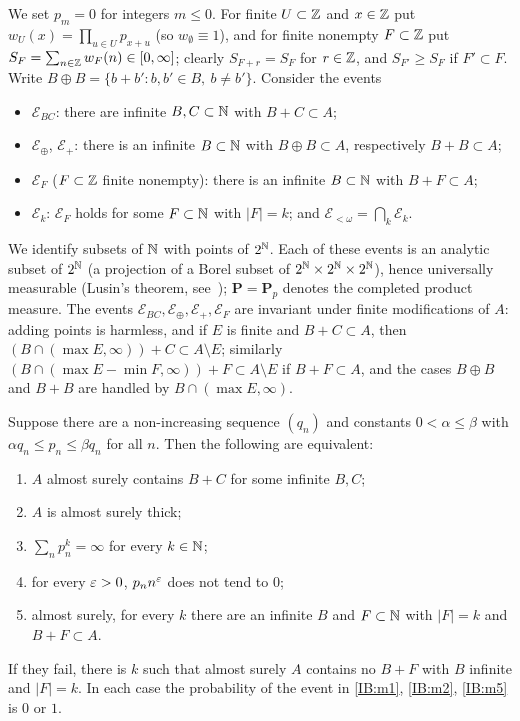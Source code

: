 We set $p_m=0$ for integers $m\le0$. For finite $U\subset\mathbb{Z}$ and $x\in\mathbb{Z}$ put
$w_U(x)=\prod_{u\in U}p_{x+u}$ (so $w_\emptyset\equiv1$), and for finite nonempty $F\subset\mathbb{Z}$
put $S_F=\sum_{n\in\mathbb{Z}}w_F(n)\in[0,\infty]$; clearly $S_{F+r}=S_F$ for $r\in\mathbb{Z}$, and
$S_{F'}\ge S_F$ if $F'\subset F$. Write $B\oplus B=\{b+b':b,b'\in B,\ b\ne b'\}$. Consider the
events
\begin{itemize}
\item $\mathcal E_{BC}$: there are infinite $B,C\subset\mathbb{N}$ with $B+C\subset A$;
\item $\mathcal E_\oplus$, $\mathcal E_+$: there is an infinite $B\subset\mathbb{N}$ with $B\oplus B\subset A$,
respectively $B+B\subset A$;
\item $\mathcal E_F$ ($F\subset\mathbb{Z}$ finite nonempty): there is an infinite $B\subset\mathbb{N}$ with $B+F\subset A$;
\item $\mathcal E_k$: $\mathcal E_F$ holds for some $F\subset\mathbb{N}$ with $|F|=k$; and
$\mathcal E_{<\omega}=\bigcap_k\mathcal E_k$.
\end{itemize}
We identify subsets of $\mathbb{N}$ with points of $2^{\mathbb{N}}$. Each of these events is an
analytic subset of $2^{\mathbb{N}}$ (a projection of a Borel subset of $2^{\mathbb{N}}\times2^{\mathbb{N}}\times2^{\mathbb{N}}$),
hence universally measurable (Lusin's theorem, see~\cite[Theorem~21.10]{kechris1995classical}); $\mathbf P=\mathbf P_p$
denotes the completed product measure.
The events $\mathcal E_{BC},\mathcal E_\oplus,\mathcal E_+,\mathcal E_F$ are invariant under
finite modifications of $A$: adding points is harmless, and if $E$ is finite and
$B+C\subset A$, then $(B\cap(\max E,\infty))+C\subset A\setminus E$; similarly
$(B\cap(\max E-\min F,\infty))+F\subset A\setminus E$ if $B+F\subset A$, and the cases $B\oplus B$ and
$B+B$ are handled by $B\cap(\max E,\infty)$.

\begin{theorem}
\label{IB:thm:monotone}
Suppose there are a non-increasing sequence $(q_n)$ and constants $0<\alpha\le\beta$ with
$\alpha q_n\le p_n\le\beta q_n$ for all $n$. Then the following are equivalent:
\begin{enumerate}[label=\textup{(\arabic*)}]
\item\label{IB:m1} $A$ almost surely contains $B+C$ for some infinite $B,C$;
\item\label{IB:m2} $A$ is almost surely thick;
\item\label{IB:m3} $\sum_np_n^k=\infty$ for every $k\in\mathbb{N}$;
\item\label{IB:m4} for every $\varepsilon>0$, $p_nn^\varepsilon$ does not tend to $0$;
\item\label{IB:m5} almost surely, for every $k$ there are an infinite $B$ and $F\subset\mathbb{N}$ with
$|F|=k$ and $B+F\subset A$.
\end{enumerate}
If they fail, there is $k$ such that almost surely $A$ contains no $B+F$ with $B$
infinite and $|F|=k$. In each case the probability of the event in \ref{IB:m1},
\ref{IB:m2}, \ref{IB:m5} is $0$ or $1$.
\end{theorem}

